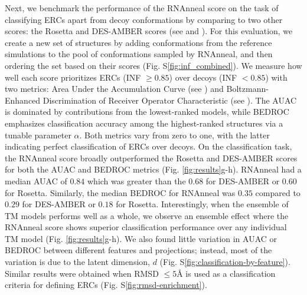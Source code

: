 \documentclass[%
aip,
 amsmath,amssymb,
reprint,%
onecolumn,
]{revtex4-1}
\begin{document}
{Next, we benchmark the performance of the RNAnneal score on the task of classifying ERCs apart from decoy conformations by comparing to two other scores: the Rosetta and DES-AMBER scores (see  and ). For this evaluation, we create a new set of structures by adding conformations from the reference simulations to the pool of conformations sampled by RNAnneal, and then ordering the set based on their scores (Fig. S\ref{fig:inf_combined}). We measure how well each score prioritizes ERCs (INF $\geq 0.85$) over decoys (INF $< 0.85$) with two metrics: Area Under the Accumulation Curve (see ) and Boltzmann-Enhanced Discrimination of Receiver Operator Characteristic (see ).\cite{truchon2007evaluating} The AUAC is dominated by contributions from the lowest-ranked models, while BEDROC emphasizes classification accuracy among the highest-ranked structures via a tunable parameter $\alpha$. Both metrics vary from zero to one, with the latter indicating perfect classification of ERCs over decoys. On the classification task, the RNAnneal score broadly outperformed the Rosetta and DES-AMBER scores for both the AUAC and BEDROC metrics (Fig. \ref{fig:results}g-h). RNAnneal had a median AUAC of $0.84$ which was greater than the $0.68$ for DES-AMBER or $0.60$ for Rosetta. Similarly, the median BEDROC for RNAnneal was $0.35$ compared to $0.29$ for DES-AMBER or $0.18$ for Rosetta. Interestingly, when the ensemble of TM models performs well as a whole, we observe an ensemble effect where the RNAnneal score shows superior classification performance over any individual TM model (Fig. \ref{fig:results}g-h). We also found little variation in AUAC or BEDROC between different features and projections; instead, most of the variation is due to the latent dimension, $d$ (Fig. S\ref{fig:classification-by-feature}). Similar results were obtained when RMSD $\leq5${\AA} is used as a classification criteria for defining ERCs (Fig. S\ref{fig:rmsd-enrichment}).

}
\end{document}
